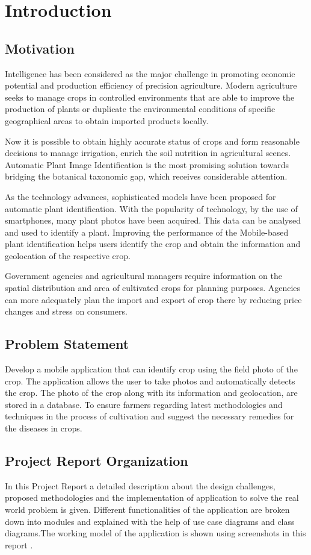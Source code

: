 \documentclass[../Report.tex]{subfiles}
\begin{document}
\chapter{Introduction}

\section{Motivation}
Intelligence has been considered as the major challenge in promoting economic potential and production efficiency of precision
agriculture. Modern agriculture seeks to manage crops in controlled environments that are able to improve the production of plants or
duplicate the environmental conditions of specific geographical areas to obtain imported products locally. \par
Now it is possible to obtain highly accurate status of crops and form reasonable decisions to manage irrigation, enrich the soil
nutrition in agricultural scenes. Automatic Plant Image Identification is the most promising solution towards bridging the botanical
taxonomic gap, which receives considerable attention. \par
As the technology advances, sophisticated models have been proposed for automatic plant identification. With the popularity of technology, 
by the use of smartphones, many plant photos have been acquired. This data can be analysed and used to identify a plant. Improving the 
performance of the Mobile-based plant identification helps users identify the crop and obtain the information and geolocation of the 
respective crop.\par
Government agencies and agricultural managers require information on the spatial distribution and area of cultivated crops for planning 
purposes. Agencies can more adequately plan the import and export of crop there by reducing price changes and stress on consumers.

\section{Problem Statement}
Develop a mobile application that can identify crop using the field photo of the crop. The application allows the user to take photos 
and automatically detects the crop. The photo of the crop along with its information and geolocation, are stored in a database. To ensure 
farmers regarding latest methodologies and techniques in the process of cultivation and suggest the necessary remedies for the 
diseases in crops.\par


\section{Project Report Organization}
In this Project Report a detailed description about the design challenges, proposed methodologies and the implementation of application 
to solve the real world problem is given. Different functionalities of the application are broken down into modules and explained with 
the help of use case diagrams and class diagrams.The working model of the application is shown using screenshots in this report .
\end{document}
